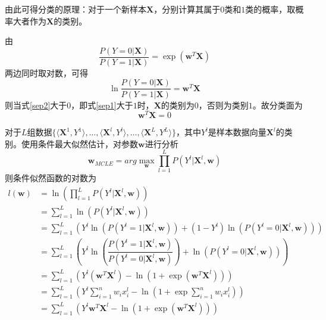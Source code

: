 由此可得分类的原理：对于一个新样本$\mathbf{X}$，分别计算其属于$0$类和$1$类的概率，取概率大者作为$\mathbf{X}$的类别。

由
\begin{equation}
    \label{sep1}
    \dfrac{P(Y=0|\mathbf{X})}{P(Y=1|\mathbf{X})} = \exp\left(\mathbf{w}^T\mathbf{X}\right)
\end{equation}
两边同时取对数，可得
\begin{equation}
    \label{sep2}
    \ln\dfrac{P(Y=0|\mathbf{X})}{P(Y=1|\mathbf{X})} = \mathbf{w}^T\mathbf{X}
\end{equation}
则当式\ref{sep2}大于$0$，即式\ref{sep1}大于$1$时，$\mathbf{X}$的类别为$0$，否则为类别$1$。故分类面为
\begin{equation}
    \mathbf{w}^T\mathbf{X}=0
\end{equation}

对于$L$组数据$\{\langle\mathbf{X}^1,Y^1\rangle,\ldots,\langle\mathbf{X}^l,Y^l\rangle,\ldots,\langle\mathbf{X}^L,Y^L\rangle\}$，其中$Y^l$是样本数据向量$\mathbf{X}^l$的类别。使用条件最大似然估计，对参数$\mathbf{w}$进行分析
\begin{equation}
    \mathbf{w}_{MCLE}=arg\max_{\mathbf{w}}\prod^L_{l=1}P\left(Y^l|\mathbf{X}^l,\mathbf{w}\right)
\end{equation}
则条件似然函数的对数为
\begin{align}
    \label{likelihood}
    l(\mathbf{w})
    &= \ln\left(\prod^L_{l=1}P\left(Y^l|\mathbf{X}^l,\mathbf{w}\right)\right) \\
    &= \sum^L_{l=1}\ln\left(P\left(Y^l|\mathbf{X}^l,\mathbf{w}\right)\right) \\
    &= \sum^L_{l=1}\left(Y^l\ln\left(P\left(Y^l=1|\mathbf{X}^l,\mathbf{w}\right)\right)+(1-Y^l)\ln\left(P\left(Y^l=0|\mathbf{X}^l,\mathbf{w}\right)\right)\right) \\
    &= \sum^L_{l=1}\left(Y^l\ln\left(\dfrac{P\left(Y^l=1|\mathbf{X}^l,\mathbf{w}\right)}{P\left(Y^l=0|\mathbf{X}^l,\mathbf{w}\right)}\right)+\ln\left(P\left(Y^l=0|\mathbf{X}^l,\mathbf{w}\right)\right)\right) \\
    \label{exp1}
    &= \sum^L_{l=1}\left(Y^l\left(\mathbf{w}^T\mathbf{X}^l\right)-\ln\left(1+\exp\left(\mathbf{w}^T\mathbf{X}^l\right)\right)\right) \\
    &= \sum^L_{l=1}\left(Y^l\sum^n_{i=1}w_ix^l_i-\ln\left(1+\exp\sum^n_{i=1}w_ix^l_i\right)\right) \\
    &= \sum^L_{l=1}\left(Y^l\mathbf{w}^T\mathbf{X}^l-\ln\left(1+\exp\left(\mathbf{w}^T\mathbf{X}^l\right)\right)\right)
\end{align}

